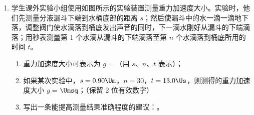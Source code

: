 \documentclass[\gkver]{gaokaozhenti}
\begin{document}
\begin{enumerate}
{	当 $R_{x} = \frac{R_{\text{滑}}}{2}$ 时，$R_{\text{外}}$ 有最大值；当滑动变阻器的滑片由 c 点向 a 端滑动时，$R_{ca}$ 减小，$R_{cd}$ 增大，易得 $R_{\text{外}}$ 减小，

	$R_{\text{总}} = R_{\text{外}} + r$ 减小，$I_{1} = \frac{E}{R_{\text{总}}}$ 增大，故电源内阻消耗的功率 $P_{r} = I_{1}^{2}r$ 增大，故 D 正确；

	$U_{R_{3} + R_{cb}} = U_{R_{2} + R_{ca}} = E - I_{1}(r + R_{1})$ 减小，

	$I_{3} = \frac{U_{R_{3} + R_{cb}}}{R_{3} + R_{cb}}$ 减小，故 $P_{R3} = I_{3}^{2}R_{3}$ 减小，故 B 错误；

	而 $I_{2} = I_{1} - I_{3}$ 增大，故 $P_{R2} = I_{2}^{2}R_{2}$ 增大，故 A 错误；

	根据电源输出功率与 $R_{\text{外}}$ 的关系图可知，当 $R_{\text{外}} > r$ 时，$R_{\text{外}}$ 减小则电源输出功率越大，故 C 正确。

}

\item
学生课外实验小组使用如图所示的实验装置测量重力加速度大小。实验时，他们先测量分液漏斗下端到水桶底部的距离 $s$；然后使漏斗中的水一滴一滴地下落，调整阀门使水滴落到桶底发出声音的同时，下一滴水刚好从漏斗的下端滴落；用秒表测量第 1 个水滴从漏斗的下端滴落至第 $n$ 个水滴落到桶底所用的时间 $t$。

\begin{enumerate}
	\item
	重力加速度大小可表示为 $g = $（用 $s$、$n$、$t$ 表示）；
	\item
	如果某次实验中，$s = 0.90\Um$，$n = 30$，$t = 13.0\Us$，则测得的重力加速度大小 $g = $$\Umsq$；（保留 2 位有效数字）
	\item
	写出一条能提高测量结果准确程度的建议：。
\end{enumerate}


\end{enumerate}
\end{document}
